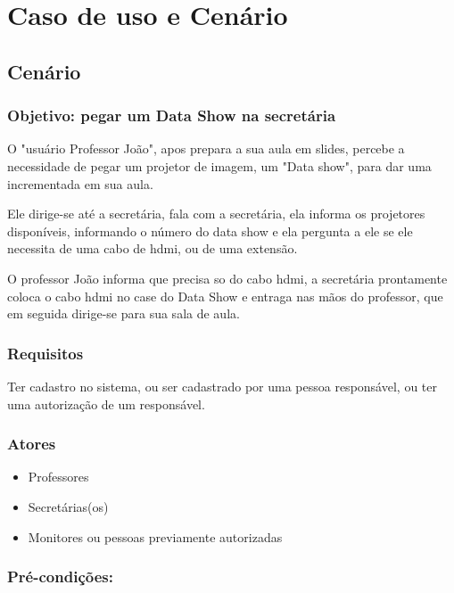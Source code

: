 \section{Caso de uso e Cenário}  

\subsection{Cenário}

\subsubsection{Objetivo: pegar um Data Show na secretária}

O "usuário Professor João", apos prepara a sua aula em slides, percebe a necessidade de pegar um projetor de imagem, um "Data show", para dar uma incrementada em sua aula.

Ele dirige-se até a secretária, fala com a secretária, ela informa os projetores
disponíveis, informando o número do data show e ela pergunta a ele se ele necessita
de uma cabo de hdmi, ou de uma extensão.

O professor João informa que precisa so do cabo hdmi, a secretária prontamente coloca
o cabo hdmi no case do Data Show e entraga nas mãos do professor, que em seguida dirige-se
para sua sala de aula. 

\subsubsection{Requisitos}

Ter cadastro no sistema, ou ser cadastrado por uma pessoa responsável, ou ter uma autorização de um responsável. 


\subsubsection{Atores}

\begin{itemize}

  \item Professores 

  \item Secretárias(os)

  \item Monitores ou pessoas previamente autorizadas

\end{itemize}


\subsubsection{Pré-condições:}

